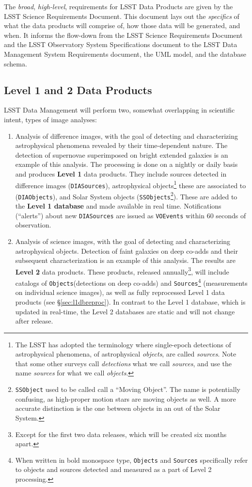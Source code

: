 \documentclass[12pt]{article}
\newcommand{\code}[1]{\texttt{#1}}
\newcommand{\DIASources}{\code{DIASources}\xspace}
\newcommand{\DIAObjects}{\code{DIAObjects}\xspace}
\newcommand{\DB}{{Level 1 database}\xspace}
\newcommand{\DR}{{Level 2 database}\xspace}
\newcommand{\Objects}{\code{Objects}\xspace}
\newcommand{\Sources}{\code{Sources}\xspace}
\newcommand{\SSObject}{\code{SSObject}\xspace}
\newcommand{\SSObjects}{\code{SSObjects}\xspace}
\newcommand{\VOEvents}{\code{VOEvents}\xspace}
\begin{document}
\vspace{1em}

The {\em broad}, {\em high-level}, requirements for LSST Data Products are given by the LSST Science Requirements Document. This document lays out the {\em specifics} of what the data products will comprise of, how those data will be generated, and when. It informs the flow-down from the LSST Science Requirements Document and the LSST Observatory System Specifications document to the LSST Data Management System Requirements document, the UML model, and the database schema.

\subsection{Level 1 and 2 Data Products}

LSST Data Management will perform two, somewhat overlapping in scientific intent, types of image analyses:

\begin{enumerate}
\item Analysis of difference images, with the goal of detecting and characterizing astrophysical phenomena revealed by their time-dependent nature. The detection of supernovae superimposed on bright extended galaxies is an example of this analysis. The processing is done on a nightly or daily basis and produces {\bf Level 1} data products. They include sources detected in difference images (\DIASources), astrophysical objects\footnote{The LSST has adopted the terminology where single-epoch detections of astrophysical phenomena, of astrophysical {\em objects}, are called {\em sources}. Note that some other surveys call {\em detections} what we call {\em sources}, and use the name {\em sources} for what we call {\em objects}.} these are associated to (\DIAObjects), and Solar System objects (\SSObjects\footnote{\SSObject used to be called call a ``Moving Object''. The name is potentially confusing, as high-proper motion stars are moving objects as well. A more accurate distinction is the one between objects in an out of the Solar System.}). These are added to the {\bf \DB} and made available in real time. Notifications (``alerts'') about new \DIASources are issued as \VOEvents within 60 seconds of observation.
\item Analysis of science images, with the goal of detecting and characterizing astrophysical objects. Detection of faint galaxies on deep co-adds and their subsequent characterization is an example of this analysis. The results are {\bf Level 2} data products. These products, released annually\footnote{Except for the first two data releases, which will be created six months apart.}, will include catalogs of \Objects (detections on deep co-adds) and \Sources\footnote{When written in bold monospace type, \Objects and \Sources specifically refer to objects and sources detected and measured as a part of Level 2 processing.} (measurements on individual science images), as well as fully reprocessed Level 1 data products (see \S \ref{sec:l1dbreproc}). In contrast to the \DB, which is updated in real-time, the \DR{}s are static and will not change after release.
\end{enumerate}
 
\end{document}
